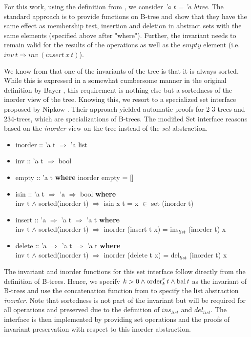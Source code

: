 For this work, using the definition from ,
we consider \textit{'a t = 'a btree}.
The standard approach is to provide functions on B-tree and show
that they have the same effect as membership test, insertion and deletion 
in abstract sets with the same elements (specified above after "where").
Further, the invariant needs to remain valid for the results of the operations
as well as the $empty$ element (i.e. $inv\ t \Longrightarrow inv\ (insert\ x\ t)$).

We know from  that one of the invariants
of the tree is that it is always sorted.
While this is expressed in a somewhat cumbersome manner
in the original definition by Bayer \parencite{DBLP:journals/acta/BayerM72},
this requirement is nothing else but a sortedness of the inorder view of the tree.
Knowing this, we resort to a specialized set interface
proposed by Nipkow \parencite{DBLP:conf/itp/Nipkow16}.
Their approach yielded automatic proofs for 2-3-trees
and 234-trees, which are specializations of B-trees.
The modified Set interface reasons based on the \textit{inorder}
view on the tree instead of the \textit{set} abstraction.

\begin{itemize}
    \itshape
    \item inorder :: 'a t $\Rightarrow$ 'a list
    \item inv :: 'a t $\Rightarrow$ bool
    \item empty :: 'a t \textup{\textbf{where}} inorder empty = []
    \item isin :: 'a t $\Rightarrow$ 'a $\Rightarrow$ bool \textup{\textbf{where}}\\
     inv t $\wedge$ sorted(inorder t) $\Longrightarrow$ isin x t = x $\in$ set (inorder t)
    \item insert :: 'a $\Rightarrow$ 'a t $\Rightarrow$ 'a t \textup{\textbf{where}}\\
     inv t $\wedge$ sorted(inorder t) $\Longrightarrow$ inorder (insert t x) = ins$_{list}$ (inorder t) x
    \item delete :: 'a $\Rightarrow$ 'a t $\Rightarrow$ 'a t \textup{\textbf{where}}\\
     inv t $\wedge$ sorted(inorder t) $\Longrightarrow$ inorder (delete t x) = del$_{list}$ (inorder t) x
\end{itemize}

The invariant and inorder functions for this set interface
follow directly from the definition of B-trees.
Hence, we specify $k > 0 \wedge \operatorname{order}^r_k t \wedge \operatorname{bal} t$
as the invariant of B-trees and use
the concatenation function from  to specify the
list abstraction \textit{inorder}.
Note that sortedness is not part of the invariant
but will be required for all operations and preserved
due to the definition of $ins_{list}$ and $del_{list}$.
The interface is then implemented by providing set operations
and the proofs of invariant preservation
with respect to this inorder abstraction.

